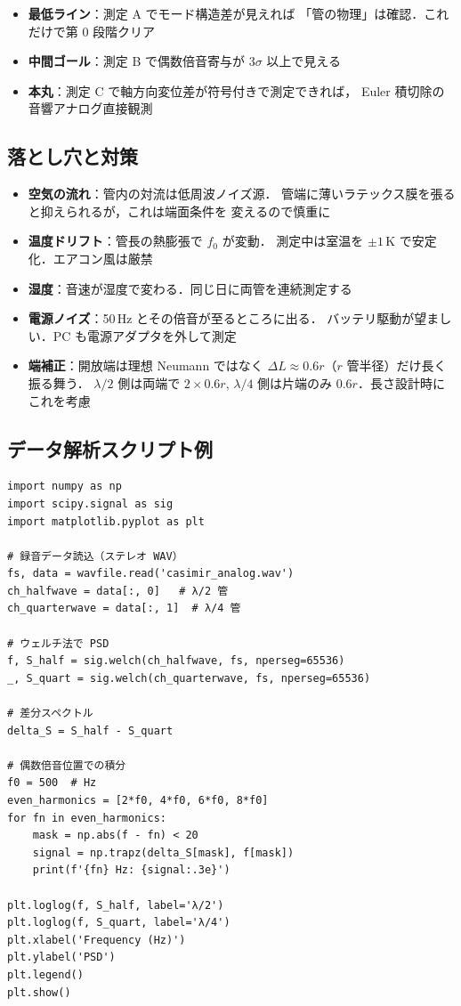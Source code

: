 \documentclass[11pt,a4paper]{article}
\begin{document}
\begin{tcolorbox}[colback=green!5,colframe=green!50!black,title=成功の判定基準]
\begin{itemize}
\item \textbf{最低ライン}：測定 A でモード構造差が見えれば
「管の物理」は確認．これだけで第 0 段階クリア
\item \textbf{中間ゴール}：測定 B で偶数倍音寄与が 3$\sigma$ 以上で見える
\item \textbf{本丸}：測定 C で軸方向変位差が符号付きで測定できれば，
Euler 積切除の音響アナログ直接観測
\end{itemize}
\end{tcolorbox}

\subsection{落とし穴と対策}

\begin{itemize}
\item \textbf{空気の流れ}：管内の対流は低周波ノイズ源．
管端に薄いラテックス膜を張ると抑えられるが，これは端面条件を
変えるので慎重に
\item \textbf{温度ドリフト}：管長の熱膨張で $f_0$ が変動．
測定中は室温を $\pm 1$\,K で安定化．エアコン風は厳禁
\item \textbf{湿度}：音速が湿度で変わる．同じ日に両管を連続測定する
\item \textbf{電源ノイズ}：50\,Hz とその倍音が至るところに出る．
バッテリ駆動が望ましい．PC も電源アダプタを外して測定
\item \textbf{端補正}：開放端は理想 Neumann ではなく
$\Delta L \approx 0.6 r$（$r$ 管半径）だけ長く振る舞う．
$\lambda/2$ 側は両端で $2\times 0.6r$, $\lambda/4$ 側は片端のみ
$0.6r$．長さ設計時にこれを考慮
\end{itemize}

\subsection{データ解析スクリプト例}

\begin{verbatim}
import numpy as np
import scipy.signal as sig
import matplotlib.pyplot as plt

# 録音データ読込（ステレオ WAV）
fs, data = wavfile.read('casimir_analog.wav')
ch_halfwave = data[:, 0]   # λ/2 管
ch_quarterwave = data[:, 1]  # λ/4 管

# ウェルチ法で PSD
f, S_half = sig.welch(ch_halfwave, fs, nperseg=65536)
_, S_quart = sig.welch(ch_quarterwave, fs, nperseg=65536)

# 差分スペクトル
delta_S = S_half - S_quart

# 偶数倍音位置での積分
f0 = 500  # Hz
even_harmonics = [2*f0, 4*f0, 6*f0, 8*f0]
for fn in even_harmonics:
    mask = np.abs(f - fn) < 20
    signal = np.trapz(delta_S[mask], f[mask])
    print(f'{fn} Hz: {signal:.3e}')

plt.loglog(f, S_half, label='λ/2')
plt.loglog(f, S_quart, label='λ/4')
plt.xlabel('Frequency (Hz)')
plt.ylabel('PSD')
plt.legend()
plt.show()
\end{verbatim}
\end{document}
